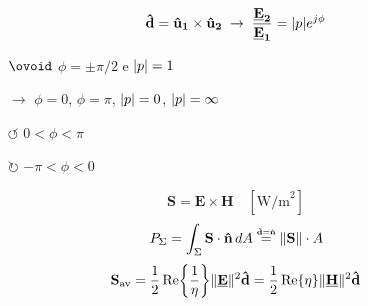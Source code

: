 \begin{myframe}
    \vspace{1mm}
    $$
        \mathbf{\Hat{d}} = \mathbf{\Hat{u}_1} \times \mathbf{\Hat{u}_2}\;\rightarrow\; \frac{\mathbf{\underline{E}_2}}{\mathbf{\underline{E}_1}} = \lvert p\rvert e^{j\phi}
    $$
    \begin{itemize}[leftmargin=*,align=left]
        \item[$\ovoid$] $\phi = \pm \pi/2$ e $\lvert p\rvert = 1$
        \item[$\rightarrow$] $\phi = 0$, $\phi = \pi$, $\lvert p\rvert = 0$, $\lvert p\rvert = \infty$
        \item[$\circlearrowleft$] $0 < \phi < \pi$
        \item[$\circlearrowright$] $-\pi < \phi < 0$
    \end{itemize}
\end{myframe}
\begin{myframe}
    $$
        \mathbf{S} = \mathbf{E} \times \mathbf{H} \quad [\text{W/m}^2]
    $$
    $$
        P_{\Sigma} = \int_{\Sigma} \mathbf{S} \cdot \mathbf{\hat{n}} \, dA \overset{\underset{\mathrm{\mathbf{\Hat{d}} = \mathbf{\Hat{n}}}}{}}{=} \lVert\mathbf{S}\rVert \cdot A
    $$
    $$
         \mathbf{S}_\text{av} = \frac{1}{2} \Re \left\{ \frac{1}{\eta} \right\}\norm{\mathbf{\underline{E}}}^2 \mathbf{\hat{d}} = \frac{1}{2} \Re \left\{\eta\right\} \norm{\mathbf{\underline{H}}}^2\mathbf{\hat{d}}
    $$
\end{myframe}
